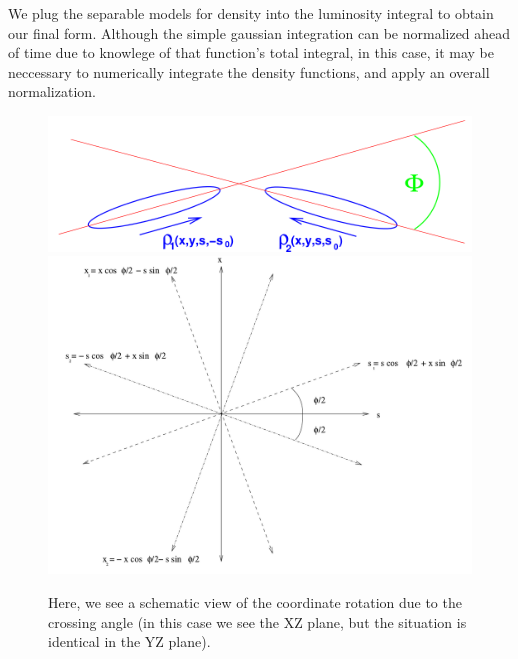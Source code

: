 We plug the separable models for density into the luminosity integral to obtain
our final form. Although the simple gaussian integration can be normalized
ahead of time due to knowlege of that function's total integral, in this case,
it may be neccessary to numerically integrate the density functions, and apply
an overall normalization.

\clearpage
\begin{figure}[ht]
  \centering
  \includegraphics[width=\linewidth,height=0.5\textheight,keepaspectratio]{./figures/xing_bunch}
  \includegraphics[width=\linewidth,height=0.5\textheight,keepaspectratio]{./figures/bunch_rotation}
  \caption{ 
    Here, we see a schematic view of the coordinate rotation due to the crossing
    angle (in this case we see the XZ plane, but the situation is identical in the
    YZ plane).
  }
  \label{fig:xz_angle}
\end{figure}



